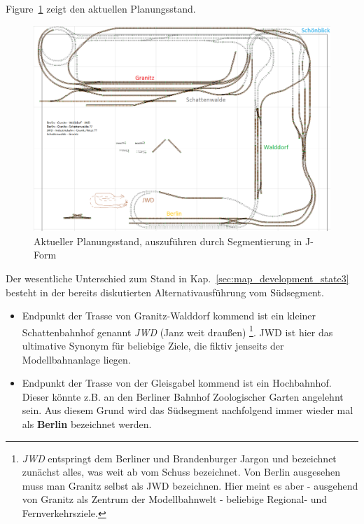 Figure~\ref{img:stateDate_granitz_modules} zeigt den aktuellen Planungsstand.

\begin{figure}[h]
\centering
  \includegraphics[width=1.0\textwidth]{img/map_evolution/stateDate_granitz_modules.png}
	\caption{Aktueller Planungsstand, auszuf\"uhren durch Segmentierung in J-Form}
	\label{img:stateDate_granitz_modules}
\end{figure}

Der wesentliche Unterschied zum Stand in Kap.~\ref{sec:map_development_state3} besteht in der bereits diskutierten Alternativausf\"uhrung vom S\"udsegment.
\begin{itemize}
	\item Endpunkt der Trasse von Granitz-Walddorf kommend ist ein kleiner Schattenbahnhof genannt \textit{JWD} (Janz weit drau{\ss}en)
	\footnote{\textit{JWD} entspringt dem Berliner und Brandenburger Jargon und bezeichnet zun\"achst alles, was weit ab vom Schuss bezeichnet.
	Von Berlin ausgesehen muss man Granitz selbst als JWD bezeichnen.
	Hier meint es aber - ausgehend von Granitz als Zentrum der Modellbahnwelt - beliebige Regional- und Fernverkehrsziele.}.
	JWD ist hier das ultimative Synonym f\"ur beliebige Ziele, die fiktiv jenseits der Modellbahnanlage liegen.
	\item Endpunkt der Trasse von der Gleisgabel kommend ist ein Hochbahnhof.
	Dieser k\"onnte z.B. an den Berliner Bahnhof Zoologischer Garten angelehnt sein.
	Aus diesem Grund wird das S\"udsegment nachfolgend immer wieder mal als \textbf{Berlin} bezeichnet werden.
\end{itemize}


